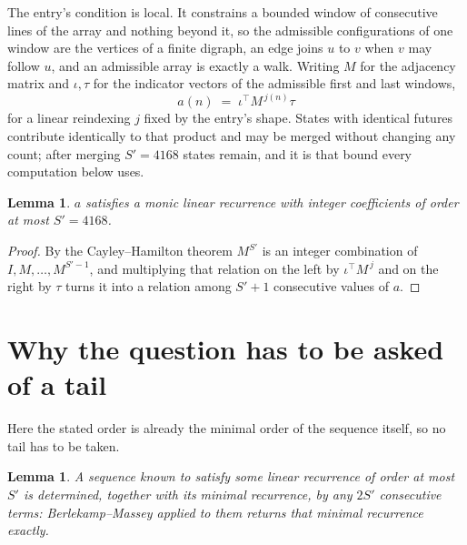 \documentclass[11pt,a4paper]{article}
\theoremstyle{plain}
\newtheorem{lemma}[theorem]{Lemma}
\theoremstyle{definition}
\begin{document}
The entry's condition is local. It constrains a bounded window of consecutive lines of the
array and nothing beyond it, so the admissible configurations of one window are the vertices of
a finite digraph, an edge joins $u$ to $v$ when $v$ may follow $u$, and an admissible array is
exactly a walk. Writing $M$ for the adjacency matrix and $\iota,\tau$ for the indicator vectors
of the admissible first and last windows,
\[
a(n)\;=\;\iota^{\!\top}M^{\,j(n)}\tau
\]
for a linear reindexing $j$ fixed by the entry's shape. States with identical futures
contribute identically to that product and may be merged without changing any count; after
merging $S'=4168$ states remain, and it is that bound every computation below uses.

\begin{lemma}\label{lem:cf}
$a$ satisfies a monic linear recurrence with integer coefficients of order at most $S'=4168$.
\end{lemma}

\begin{proof}
By the Cayley--Hamilton theorem $M^{S'}$ is an integer combination of $I,M,\dots,M^{S'-1}$,
and multiplying that relation on the left by $\iota^{\!\top}M^{\,j}$ and on the right by
$\tau$ turns it into a relation among $S'+1$ consecutive values of $a$.
\end{proof}

\section{Why the question has to be asked of a tail}

Here the stated order is already the minimal order of the sequence itself, so no tail has to be taken.

\begin{lemma}\label{lem:bm}
A sequence known to satisfy some linear recurrence of order at most $S'$ is determined,
together with its minimal recurrence, by any $2S'$ consecutive terms: Berlekamp--Massey applied
to them returns that minimal recurrence exactly.
\end{lemma}
\end{document}
